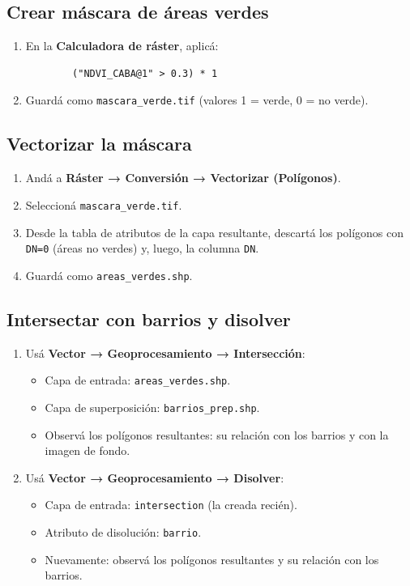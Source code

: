 \documentclass{article}
\begin{document}
\subsection{Crear máscara de áreas verdes}
\begin{enumerate}
    \item En la \textbf{Calculadora de ráster}, aplicá:
    \begin{verbatim}
        ("NDVI_CABA@1" > 0.3) * 1
    \end{verbatim}
    \item Guardá como \texttt{mascara\_verde.tif} (valores 1 = verde, 0 = no verde).
\end{enumerate}

\subsection{Vectorizar la máscara}
\begin{enumerate}
    \item Andá a \textbf{Ráster → Conversión → Vectorizar (Polígonos)}.
    \item Seleccioná \texttt{mascara\_verde.tif}.
    \item Desde la tabla de atributos de la capa resultante, descartá los polígonos con \texttt{DN=0} (áreas no verdes) y, luego, la columna \texttt{DN}.
    \item Guardá como \texttt{areas\_verdes.shp}.
\end{enumerate}

\subsection{Intersectar con barrios y disolver}
\begin{enumerate}
    \item Usá \textbf{Vector → Geoprocesamiento → Intersección}:
    \begin{itemize}
        \item Capa de entrada: \texttt{areas\_verdes.shp}.
        \item Capa de superposición: \texttt{barrios\_prep.shp}.
        \item Observá los polígonos resultantes: su relación con los barrios y con la imagen de fondo.
    \end{itemize}
    \item Usá \textbf{Vector → Geoprocesamiento → Disolver}:
    \begin{itemize}
        \item Capa de entrada: \texttt{intersection} (la creada recién).
        \item Atributo de disolución: \texttt{barrio}.
        \item Nuevamente: observá los polígonos resultantes y su relación con los barrios.
    \end{itemize}
\end{enumerate}
\end{document}
